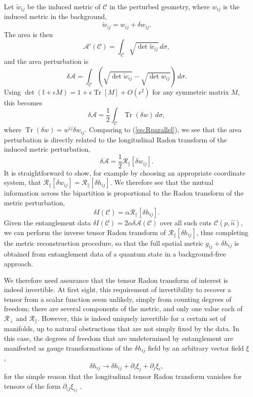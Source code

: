 \documentclass[%
preprint,
nofootinbib,
amsmath,amssymb,
aps,
prd,
showpacs,
superscriptaddress
]{revtex4-1}
\DeclareMathOperator{\Tr}{Tr}
\newcommand{\R}{\mathscr{R}}
\newcommand{\area}{\mathcal{A}}
\begin{document}
Let $\tilde{w}_{ij}$ be the induced metric of $\mathcal{C}$ in the perturbed geometry, where $w_{ij}$ is the induced metric in the background,
\begin{equation}
  \tilde{w}_{ij} = w_{ij} + \delta w_{ij}.
\end{equation}
The area is then
\begin{equation}
  \area'(\mathcal{C}) = \int_\mathcal{C} \sqrt{\det{\tilde{w}_{ij}}}\, d\sigma,
\end{equation}
and the area perturbation is 
\begin{equation}
  \delta \area = \int_\mathcal{C} \left(\sqrt{\det{\tilde{w}_{ij}}}-\sqrt{\det{{w}_{ij}}}\right)\, d\sigma.
\end{equation}
Using $\det(\mathbb{I}+\epsilon M)=1+\epsilon\Tr[M]+O(\epsilon^2)$ for any symmetric matrix $M$, this becomes
\begin{equation}
  \delta \area = \frac 1 2 \int_\mathcal{C} \Tr (\delta w) \, d\sigma,
\end{equation}
where $\Tr (\delta w) = w^{ij}\delta w_{ij}$.
Comparing to (\ref{eq:Rparallel}), we see that the area perturbation is directly related to the longitudinal Radon transform of the induced metric perturbation,
\begin{equation}
  \delta \area = \frac 1 2\R_\parallel [\delta w_{ij}].
\end{equation}
It is straightforward to show, for example by choosing an appropriate coordinate system, that $\R_{\parallel}[\delta w_{ij}] =\R_{\parallel}[\delta h_{ij}] $.
We therefore see that the mutual information across the bipartition is proportional to the Radon transform of the metric perturbation,
\begin{equation}
\delta I(\mathcal{C})= \alpha \R_{\parallel}[\delta h_{ij}] .
\end{equation}
Given the entanglement data $\delta I(\mathcal{C}) =2\alpha \delta \area(\mathcal{C})$ over all such cuts $\mathcal{C}(p,\hat{n})$, we can perform the inverse tensor Radon transform of $ \R_{\parallel}[\delta h_{ij}]$, thus completing the metric reconstruction procedure, so that the full spatial metric $g_{ij}+\delta h_{ij}$ is obtained from entanglement data of a quantum state in a background-free approach. 

We therefore need assurance that the tensor Radon transform of interest is indeed invertible.
At first sight, this requirement of invertibility to recover a tensor from a scalar function seem unlikely, simply from counting degrees of freedom; there are several components of the metric, and only one value each of $\R_\bot$ and $\R_\parallel$. 
However, this is indeed uniquely invertible for a certain set of manifolds, up to natural obstructions that are not simply fixed by the data. In this case, the degrees of freedom that are undetermined by entanglement are manifested as gauge transformations of the $\delta h_{ij}$ field by an arbitrary vector field $\xi$,
\begin{equation}
\delta h_{ij} \rightarrow \delta h_{ij} +\partial_i \xi_j +\partial_j\xi_i,
\end{equation}
for the simple reason that the longitudinal tensor Radon transform vanishes for tensors of the form $\partial_{(j}\xi_{i)}$ .
\end{document}
